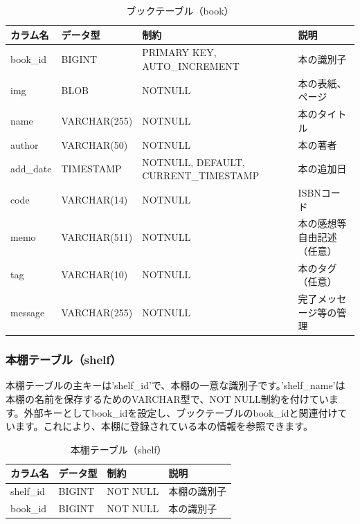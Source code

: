 \documentclass[a4paper, 11pt, titlepage]{jsarticle}
\begin{document}
\begin{table}[htbp]
  \centering
  \begin{tabular}{|l|l|>{\centering\arraybackslash}m{4cm}|>{\centering\arraybackslash}m{3cm}|}
    \hline
    \textbf{カラム名} & \textbf{データ型} & \textbf{制約} & \textbf{説明} \\
    \hline\hline
    book\_id & BIGINT & PRIMARY KEY, AUTO\_INCREMENT & 本の識別子 \\
    \hline
    img & BLOB & NOTNULL & 本の表紙、ページ \\
    \hline
    name & VARCHAR(255) & NOTNULL & 本のタイトル \\
    \hline
    author & VARCHAR(50) & NOTNULL & 本の著者 \\
    \hline
    add\_date & TIMESTAMP & NOTNULL, DEFAULT, CURRENT\_TIMESTAMP & 本の追加日 \\
    \hline
    code & VARCHAR(14) & NOTNULL & ISBNコード \\
    \hline
    memo & VARCHAR(511) & NOTNULL & 本の感想等自由記述（任意） \\
    \hline
    tag & VARCHAR(10) & NOTNULL & 本のタグ（任意） \\
    \hline
    message & VARCHAR(255) & NOTNULL & 完了メッセージ等の管理 \\
    \hline
  \end{tabular}
  \caption{ブックテーブル（book）}
  \label{tab:booktable}
\end{table}

\subsubsection{本棚テーブル（shelf）}
本棚テーブルの主キーは'shelf\_id'で、本棚の一意な識別子です。'shelf\_name'は本棚の名前を保存するためのVARCHAR型で、NOT NULL制約を付けています。外部キーとしてbook\_idを設定し、ブックテーブルのbook\_idと関連付けています。これにより、本棚に登録されている本の情報を参照できます。
\begin{table}[htbp]
  \centering
  \begin{tabular}{|l|l|>{\centering\arraybackslash}m{4cm}|>{\centering\arraybackslash}m{3cm}|}
    \hline
    \textbf{カラム名} & \textbf{データ型} & \textbf{制約} & \textbf{説明} \\
    \hline\hline
    shelf\_id & BIGINT & NOT NULL & 本棚の識別子 \\
    \hline
    book\_id & BIGINT & NOT NULL & 本の識別子 \\
    \hline
  \end{tabular}
  \caption{本棚テーブル（shelf）}
  \label{tab:shelftable}
\end{table}
\end{document}
